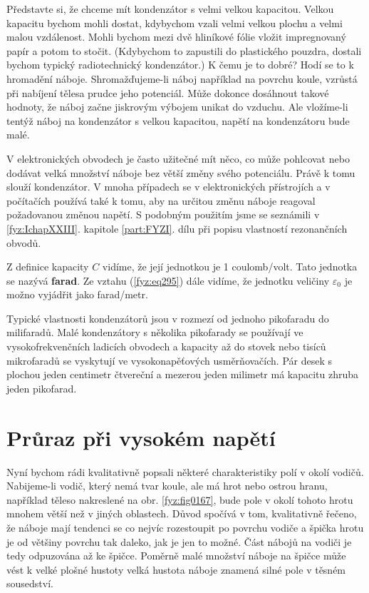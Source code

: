   Představte si, že chceme mít kondenzátor s velmi velkou kapacitou. Velkou kapacitu bychom mohli
  dostat, kdybychom vzali velmi velkou plochu a velmi malou vzdálenost. Mohli bychom mezi dvě
  hliníkové fólie vložit impregnovaný papír a potom to stočit. (Kdybychom to zapustili do
  plastického pouzdra, dostali bychom typický radiotechnický kondenzátor.) K čemu je to dobré? Hodí
  se to k hromadění náboje. Shromažďujeme-li náboj například na povrchu koule, vzrůstá při nabíjení
  tělesa prudce jeho potenciál. Může dokonce dosáhnout takové hodnoty, že náboj začne jiskrovým
  výbojem unikat do vzduchu. Ale vložíme-li tentýž náboj na kondenzátor s velkou kapacitou, napětí
  na kondenzátoru bude malé.

  V elektronických obvodech je často užitečné mít něco, co může pohlcovat nebo dodávat velká
  množství náboje bez větší změny svého potenciálu. Právě k tomu slouží kondenzátor. V mnoha
  případech se v elektronických přístrojích a v počítačích používá také k tomu, aby na určitou změnu
  náboje reagoval požadovanou změnou napětí. S podobným použitím jsme se seznámili v
  \ref{fyz:IchapXXIII}. kapitole \ref{part:FYZI}. dílu při popisu vlastností rezonančních obvodů.

  Z definice kapacity \(C\) vidíme, že její jednotkou je 1 coulomb/volt. Tato jednotka se nazývá
  \textbf{farad}. Ze vztahu (\ref{fyz:eq295}) dále vidíme, že jednotku veličiny \(\varepsilon_0\) je
  možno vyjádřit jako farad/metr.

  Typické vlastnosti kondenzátorů jsou v rozmezí od jednoho pikofaradu do milifaradů. Malé
  kondenzátory s několika pikofarady se používají ve vysokofrekvenčních ladicích obvodech a kapacity
  až do stovek nebo tisíců mikrofaradů se vyskytují ve vysokonapěťových usměrňovačích. Pár desek s
  plochou jeden centimetr čtvereční a mezerou jeden milimetr má kapacitu zhruba jeden pikofarad.
  
\section{Průraz při vysokém napětí}\label{fyz:IIchapVsecXX}
  Nyní bychom rádi kvalitativně popsali některé charakteristiky polí v okolí vodičů. Nabijeme-li
  vodič, který nemá tvar koule, ale má hrot nebo ostrou hranu, například těleso nakreslené na obr.
  \ref{fyz:fig0167}, bude pole v okolí tohoto hrotu mnohem větší než v jiných oblastech. Důvod
  spočívá v tom, kvalitativně řečeno, že náboje mají tendenci se co nejvíc rozestoupit po povrchu
  vodiče a špička hrotu je od většiny povrchu tak daleko, jak je jen to možné. Část nábojů na vodiči
  je tedy odpuzována až ke špičce. Poměrně malé množství náboje na špičce může vést k velké plošné
  hustoty velká hustota náboje znamená silné pole v těsném sousedství.

